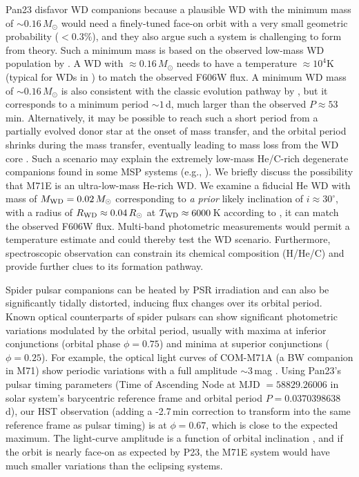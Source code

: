 \documentclass[twocolumn]{aastex631}
\begin{document}
Pan23 disfavor WD companions because a plausible WD with the minimum mass of $\sim0.16\,M_\odot$ would need a finely-tuned face-on orbit with a very small geometric probability ($<0.3\%$), and they also argue such a system is challenging to form from theory. Such a minimum mass is based on the observed low-mass WD population by \citet{Brown2016}. A WD with $\approx 0.16\,M_\odot$ needs to have a temperature $\approx10^4$K (typical for WDs in \citealt{Brown2016}) to match the observed F606W flux. A minimum WD mass of $\sim0.16\,M_\odot$ is also consistent with the classic evolution pathway by \citet{HeWD1999}, but it corresponds to a minimum period $\sim1$\,d, much larger than the observed $P\approx53$\,min. Alternatively, it may be possible to reach such a short period from a partially evolved donor star at the onset of mass transfer, and the orbital period shrinks during the mass transfer, eventually leading to mass loss from the WD core \citep[see, e.g.][]{Nelson1986, DeloyeBildsten2003}. Such a scenario may explain the extremely low-mass He/C-rich degenerate companions found in some MSP systems (e.g., \citealt{Bailes2011, Romani2012}). We briefly discuss the possibility that M71E is an ultra-low-mass He-rich WD. We examine a fiducial He WD with mass of $M_{\rm WD} = 0.02\,M_\odot$ corresponding to {\it a prior} likely inclination of $i\approx30^\circ$, with a radius of $R_{\rm WD} \approx 0.04\,R_\odot$ at $T_{\rm WD} \approx 6000$\,K according to \citet{DeloyeBildsten2003}, it can match the observed F606W flux.
Multi-band photometric measurements would permit a temperature estimate and could thereby test the WD scenario. Furthermore, spectroscopic observation can constrain its chemical composition (H/He/C) and provide further clues to its formation pathway.

Spider pulsar companions can be heated by PSR irradiation and can also be significantly tidally distorted, inducing flux changes over its orbital period. Known optical counterparts of spider pulsars can show significant photometric variations modulated by the orbital period, usually with maxima at inferior conjunctions (orbital phase $\phi = 0.75$) and minima at superior conjunctions ($\phi = 0.25$).  For example, the optical light curves of COM-M71A (a BW companion in M71) show periodic variations with a full amplitude $\sim 3$\,mag \citep{COM-M71}. Using Pan23's pulsar timing parameters (Time of Ascending Node at MJD $= 58829.26006$ in solar system's barycentric reference frame and orbital period $P = 0.0370398638$\,d), our HST observation (adding a -2.7\,min correction to transform into the same reference frame as pulsar timing) is at $\phi = 0.67$, which is close to the expected maximum. The light-curve amplitude is a function of orbital inclination \citep{COM-M5}, and if the orbit is nearly face-on as expected by P23, the M71E system would have much smaller variations than the eclipsing systems. 
\end{document}
